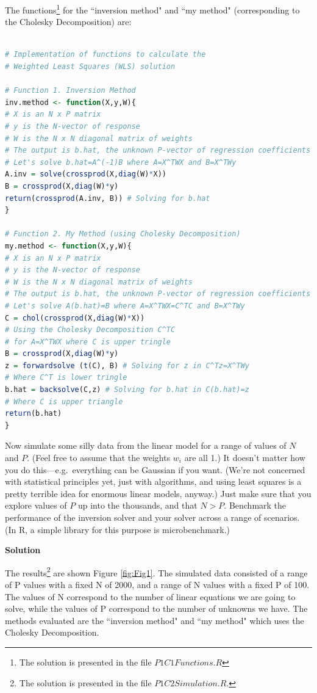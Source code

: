 \documentclass[11 pt]{article}
\begin{document}
\begin{enumerate}[label=(\Alph*)]
The functions\footnote{The solution is presented in the file $P1C1Functions.R$} for the ``inversion method"  and ``my method" (corresponding to the Cholesky Decomposition) are: 
\begin{lstlisting}[language=R]

# Implementation of functions to calculate the 
# Weighted Least Squares (WLS) solution

# Function 1. Inversion Method
inv.method <- function(X,y,W){
# X is an N x P matrix
# y is the N-vector of response
# W is the N x N diagonal matrix of weights
# The output is b.hat, the unknown P-vector of regression coefficients
# Let's solve b.hat=A^(-1)B where A=X^TWX and B=X^TWy
A.inv = solve(crossprod(X,diag(W)*X))
B = crossprod(X,diag(W)*y)
return(crossprod(A.inv, B)) # Solving for b.hat
}

# Function 2. My Method (using Cholesky Decomposition)
my.method <- function(X,y,W){
# X is an N x P matrix
# y is the N-vector of response
# W is the N x N diagonal matrix of weights
# The output is b.hat, the unknown P-vector of regression coefficients 
# Let's solve A(b.hat)=B where A=X^TWX=C^TC and B=X^TWy
C = chol(crossprod(X,diag(W)*X)) 
# Using the Cholesky Decomposition C^TC
# for A=X^TWX where C is upper tringle
B = crossprod(X,diag(W)*y)
z = forwardsolve (t(C), B) # Solving for z in C^Tz=X^TWy 
# Where C^T is lower tringle 
b.hat = backsolve(C,z) # Solving for b.hat in C(b.hat)=z
# Where C is upper triangle 
return(b.hat)
}
\end{lstlisting}



\newpage
Now simulate some silly data from the linear model for a range of values of $N$ and $P$.  (Feel free to assume that the weights $w_i$ are all 1.)  It doesn't matter how you do this---e.g.~everything can be Gaussian if you want.  (We're not concerned with statistical principles yet, just with algorithms, and using least squares is a pretty terrible idea for enormous linear models, anyway.)  Just make sure that you explore values of $P$ up into the thousands, and that $N > P$.  Benchmark the performance of the inversion solver and your solver across a range of scenarios.  (In R, a simple library for this purpose is microbenchmark.)

\vspace{2mm}
\textbf{Solution}

The results\footnote{The solution is presented in the file $P1C2Simulation.R$.} are shown Figure \ref{fig:Fig1}. The simulated data consisted of a range of P values with a fixed N of 2000, and a range of N values with a fixed P of 100. The values of N correspond to the number of linear equations we are going to solve, while the values of P correspond to the number of unknowns we have. The methods evaluated are the  ``inversion method" and ``my method" which uses the Cholesky Decomposition.


\end{enumerate}
\end{document}
